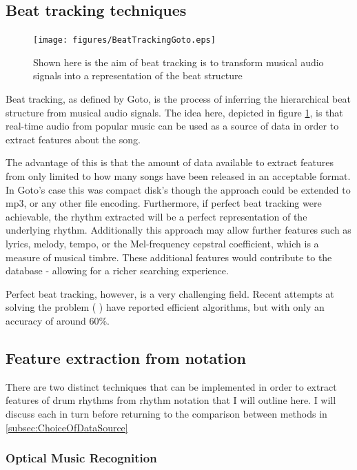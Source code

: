 \documentclass[12pt,twoside,notitlepage]{report}
\begin{document}
		\subsection{Beat tracking techniques}
		
		\begin{figure}[h]
			\centerline{\texttt{[image: figures/BeatTrackingGoto.eps]}}
			\caption{\label{beatTracking} Shown here is the aim of beat tracking is to transform musical audio signals into a representation of the beat structure\cite{Goto2001}}
\end{figure}

		Beat tracking, as defined by Goto\cite{Goto2001}, is the process of inferring the hierarchical beat structure from musical audio signals. The idea here, depicted in figure \ref{beatTracking}, is that real-time audio from popular music can be used as a source of data in order to extract features about the song. 
		
		The advantage of this is that the amount of data available to extract features from only limited to how many songs have been released in an acceptable format. In Goto's case this was compact disk's though the approach could be extended to mp3, or any other file encoding. Furthermore, if perfect beat tracking were achievable, the rhythm extracted will be a perfect representation of the underlying rhythm. Additionally this approach may allow further features such as lyrics, melody, tempo, or the Mel-frequency cepstral coefficient, which is a measure of musical timbre. These additional features would contribute to the database - allowing for a richer searching experience.
		
		Perfect beat tracking, however, is a very challenging field. Recent attempts at solving the problem (\cite{Ellis2007} \cite{EllisPoliner2007} \cite{DaviesPlumbley2007}) have reported efficient algorithms, but with only an accuracy of around 60\%.
		\subsection{Feature extraction from notation}
		There are two distinct techniques that can be implemented in order to extract features of drum rhythms from rhythm notation that I will outline here. I will discuss each in turn before returning to the comparison between methods in \ref{subsec:ChoiceOfDataSource}
			\subsubsection{Optical Music Recognition}
			
\end{document}
